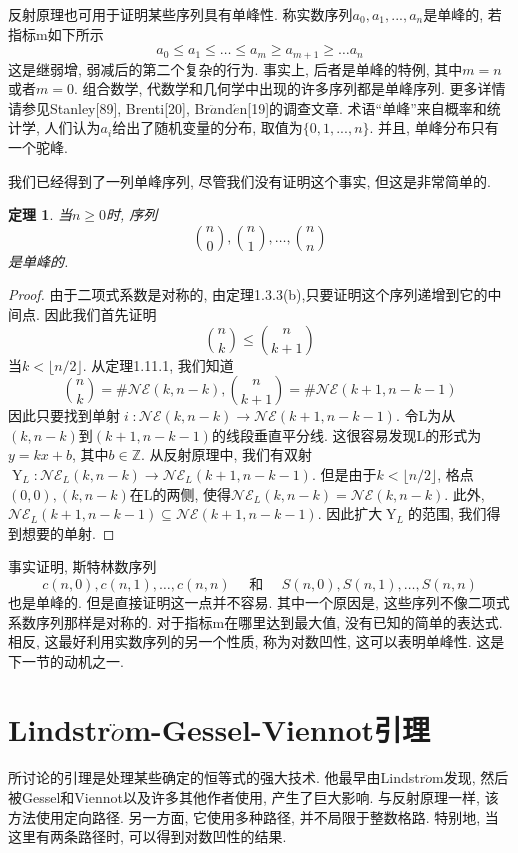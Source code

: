 \documentclass{ctexbook}
\newtheorem{thm}{定理}[section]
\begin{document}
	反射原理也可用于证明某些序列具有单峰性. 称实数序列$a_{0},a_{1},...,a_{n}$是单峰的, 若指标m如下所示
\[
	a_{0}\leq a_{1}\leq \ldots \leq a_{m}\geq a_{m+1}\geq \ldots a_{n}
\]
	这是继弱增, 弱减后的第二个复杂的行为. 事实上, 后者是单峰的特例, 其中$m=n$或者$m=0$.
	组合数学, 代数学和几何学中出现的许多序列都是单峰序列. 更多详情请参见Stanley[89], Brenti[20], Br$\ddot{a}$nd$\acute{e}$n[19]的调查文章. 术语“单峰”来自概率和统计学, 人们认为$a_{i}$给出了随机变量的分布, 取值为$\{0,1,...,n\}$. 并且, 单峰分布只有一个驼峰.

	我们已经得到了一列单峰序列, 尽管我们没有证明这个事实, 但这是非常简单的.
\begin{thm}
	当$n \geq 0$时, 序列
	\[
	\binom{n}{0},\binom{n}{1},\ldots,\binom{n}{n}
	\]
	是单峰的.
\end{thm}
\begin{proof}
	由于二项式系数是对称的, 由定理1.3.3(b),只要证明这个序列递增到它的中间点. 因此我们首先证明
	\[
	\binom{n}{k} \leq \binom{n}{k+1}
	\]
	当$k<\lfloor n/2 \rfloor$. 从定理1.11.1, 我们知道
	\[
	\binom{n}{k}=\# \mathcal{N} \mathcal{E}(k,n-k) ,
	\binom{n}{k+1}=\# \mathcal{N} \mathcal{E}(k+1,n-k-1)
	\]
	因此只要找到单射$\operatorname{\mathit{i}}:\mathcal{N} \mathcal{E}(k,n-k) \rightarrow \mathcal{N} \mathcal{E}(k+1,n-k-1)$. 令L为从$(k,n-k)$到$(k+1,n-k-1)$的线段垂直平分线. 这很容易发现L的形式为$y=kx+b$, 其中$b\in \mathbb{Z}$. 从反射原理中, 我们有双射$\operatorname{Y}_{L}:\mathcal{N} \mathcal{E}_{L}(k,n-k) \rightarrow \mathcal{N} \mathcal{E}_{L}(k+1,n-k-1)$. 但是由于$k<\lfloor n/2 \rfloor$, 格点$(0,0),(k,n-k)$在L的两侧, 使得$\mathcal{N} \mathcal{E}_{L}(k,n-k)=\mathcal{N} \mathcal{E}(k,n-k)$. 此外, $\mathcal{N} \mathcal{E}_{L}(k+1,n-k-1) \subseteq \mathcal{N} \mathcal{E}(k+1,n-k-1)$. 因此扩大$\operatorname{Y}_{L}$的范围, 我们得到想要的单射.
\end{proof}


	事实证明, 斯特林数序列
\[
	c(n,0),c(n,1),\ldots,c(n,n) \quad \text{ 和 }  \quad S(n,0),S(n,1),\ldots,S(n,n)
\]
	也是单峰的. 但是直接证明这一点并不容易. 其中一个原因是, 这些序列不像二项式系数序列那样是对称的. 对于指标m在哪里达到最大值, 没有已知的简单的表达式. 相反, 这最好利用实数序列的另一个性质, 称为对数凹性, 这可以表明单峰性. 这是下一节的动机之一.


\section{Lindstr$\ddot{o}$m-Gessel-Viennot引理}
	所讨论的引理是处理某些确定的恒等式的强大技术. 他最早由Lindstr$\ddot{o}$m发现, 然后被Gessel和Viennot以及许多其他作者使用, 产生了巨大影响. 与反射原理一样, 该方法使用定向路径. 另一方面, 它使用多种路径, 并不局限于整数格路. 特别地, 当这里有两条路径时, 可以得到对数凹性的结果.
\end{document}
